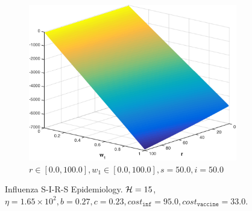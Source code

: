 \begin{figure}[t!]
    \begin{subfigure}[b]{0.4\textwidth}
        \includegraphics[width=\linewidth, height=0.8\linewidth]{images/sir_r_w1}
        \caption{$ r \in \left[ 0.0, 100.0 \right], w_1 \in \left[ 0.0, 100.0 \right], s = 50.0, i = 50.0$}
        \label{fig:sir_r_w1}
    \end{subfigure}      
    \caption{Influenza S-I-R-S Epidemiology. $ \mathcal{H} = 15 $, $ \eta = 1.65 \times 10^2, b = 0.27, c = 0.23, cost_{\mathtt{inf}} = 95.0, cost_{\mathtt{vaccine}} = 33.0$.}
    \label{fig:sir}
\end{figure}
    
